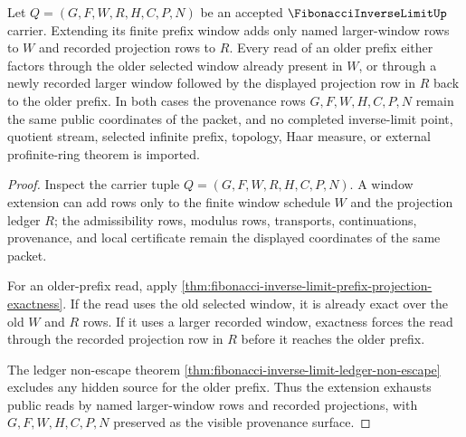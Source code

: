 \begin{theorem}
\label{thm:fibonacci-inverse-limit-window-extension-exhaustion}
Let $Q=(G,F,W,R,H,C,P,N)$ be an accepted $\FibonacciInverseLimitUp$ carrier. Extending its finite prefix window adds only named larger-window rows to $W$ and recorded projection rows to $R$. Every read of an older prefix either factors through the older selected window already present in $W$, or through a newly recorded larger window followed by the displayed projection row in $R$ back to the older prefix. In both cases the provenance rows $G,F,W,H,C,P,N$ remain the same public coordinates of the packet, and no completed inverse-limit point, quotient stream, selected infinite prefix, topology, Haar measure, or external profinite-ring theorem is imported.
\end{theorem}
\begin{proof}
Inspect the carrier tuple $Q=(G,F,W,R,H,C,P,N)$. A window extension can add rows only to the finite window schedule $W$ and the projection ledger $R$; the admissibility rows, modulus rows, transports, continuations, provenance, and local certificate remain the displayed coordinates of the same packet.

For an older-prefix read, apply \autoref{thm:fibonacci-inverse-limit-prefix-projection-exactness}. If the read uses the old selected window, it is already exact over the old $W$ and $R$ rows. If it uses a larger recorded window, exactness forces the read through the recorded projection row in $R$ before it reaches the older prefix.

The ledger non-escape theorem \autoref{thm:fibonacci-inverse-limit-ledger-non-escape} excludes any hidden source for the older prefix. Thus the extension exhausts public reads by named larger-window rows and recorded projections, with $G,F,W,H,C,P,N$ preserved as the visible provenance surface.
\end{proof}


\begin{closurestatus}{\FibonacciInverseLimitUp}
  \theoryclosure{\seedClosure}
  \formalstatus{\unformalizedV}
\end{closurestatus}
